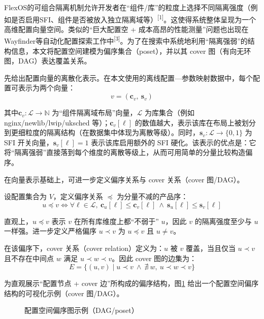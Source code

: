 \documentclass[UTF8,a4paper,12pt,twoside]{ctexart}  %
\begin{document}
FlexOS的可组合隔离机制允许开发者在``组件/库''的粒度上选择不同隔离强度（例如是否启用SFI、组件是否被放入独立隔离域等）\textsuperscript{[1]}。这使得系统整体呈现为一个高维配置向量空间。类似的``巨大配置空 + 成本高昂的性能测量''问题也出现在 Wayfinder等自动化配置探索工作中\textsuperscript{[3]}。为了在搜索中系统地利用``隔离强弱''的结构信息，本文将配置空间建模为偏序集合（poset），并以其
cover 图（有向无环图，DAG）表达覆盖关系。

先给出配置向量的离散化表示。在本文使用的离线配置---参数映射数据中，每个配置可表示为两个向量：
\begin{equation}
v = (\mathbf{c}_v,\ \mathbf{s}_v)
\end{equation}

其中\(\mathbf{c}_v: \mathcal{L}\to \mathbb{N}\)
为``组件隔离域布局''向量，\(\mathcal{L}\) 为库集合（例如
nginx/newlib/lwip/uksched 等）；\(\mathbf{c}_v[\ell]\)
的数值越大，表示该库在布局上被划分到更细粒度的隔离结构（在数据集中体现为离散等级）。同时，\(\mathbf{s}_v: \mathcal{L}\to \{0,1\}\)
为 SFI 开关向量，\(\mathbf{s}_v[\ell]=1\) 表示该库启用额外的 SFI 硬化。该表示的优点是：它将``隔离强弱''直接落到每个维度的离散等级上，从而可用简单的分量比较构造偏序。

在向量表示基础上，可进一步定义偏序关系与 cover 关系（cover 图/DAG）。

设配置集合为 \(V\)，定义偏序关系 \(\preceq\) 为分量不减的产品序：
\begin{equation}
u \preceq v \iff \forall \ell\in\mathcal{L},\ \mathbf{c}_u[\ell] \le \mathbf{c}_v[\ell]\ \wedge\ \mathbf{s}_u[\ell] \le \mathbf{s}_v[\ell]
\end{equation}

直观上，\(u\preceq v\) 表示 \(v\) 在所有库维度上都``不弱于'' \(u\)，因此
\(v\) 的隔离强度至少与 \(u\) 一样强。进一步定义严格偏序 \(u\prec v\) 为
\(u\preceq v\) 且 \(u\ne v\)。

在该偏序下，cover 关系（cover relation）定义为：\(u\) 被 \(v\)
覆盖，当且仅当 \(u\prec v\) 且不存在中间点 \(w\) 满足
\(u\prec w\prec v\)。因此 cover 图的边集为：
\begin{equation}
E = \{(u, v) \mid u \prec v \ \wedge\ \nexists\ w,\ u \prec w \prec v\}
\end{equation}

为直观展示``配置节点 + cover 边''所构成的偏序结构，图\ref{fig:fig08_plot}
给出一个配置空间偏序结构的可视化示例（cover 图/DAG）。
\begin{figure}[h]
  \centering
  
  \caption{配置空间偏序图示例（DAG/poset）}
  \label{fig:fig08_plot}
\end{figure}
\end{document}
